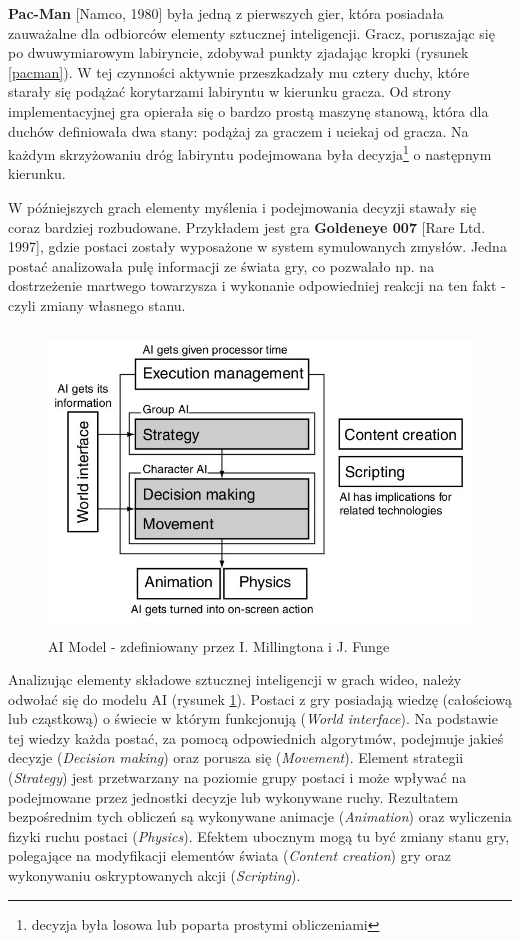 \textbf{Pac-Man} [Namco, 1980] była jedną z pierwszych gier, która posiadała zauważalne dla odbiorców elementy sztucznej inteligencji. Gracz, poruszając się po dwuwymiarowym labiryncie, zdobywał punkty zjadając kropki (rysunek \ref{pacman}). W tej czynności aktywnie przeszkadzały mu cztery duchy, które starały się podążać korytarzami labiryntu w kierunku gracza. Od strony implementacyjnej gra opierała się o bardzo prostą maszynę stanową, która dla duchów definiowała dwa stany: podążaj za graczem i uciekaj od gracza. Na każdym skrzyżowaniu dróg labiryntu podejmowana była decyzja\footnote{decyzja była losowa lub poparta prostymi obliczeniami} o następnym kierunku.

W późniejszych grach elementy myślenia i podejmowania decyzji stawały się coraz bardziej rozbudowane. Przykładem jest gra \textbf{Goldeneye 007} [Rare Ltd. 1997], gdzie postaci zostały wyposażone w system symulowanych zmysłów. Jedna postać analizowała pulę informacji ze świata gry, co pozwalało np. na dostrzeżenie martwego towarzysza i wykonanie odpowiedniej reakcji na ten fakt - czyli zmiany własnego stanu.

\begin{figure}
\begin{center}
	\includegraphics[width=120mm,height=80mm]{images/aimodel}
	\caption{AI Model - zdefiniowany przez I. Millingtona i J. Funge\label{aimodel}}
\end{center}
\end{figure}

Analizując elementy składowe sztucznej inteligencji w grach wideo, należy odwołać się do modelu AI (rysunek \ref{aimodel}). Postaci z gry posiadają wiedzę (całościową lub cząstkową) o świecie w którym funkcjonują (\emph{World interface}). Na podstawie tej wiedzy każda postać, za pomocą odpowiednich algorytmów, podejmuje jakieś decyzje (\emph{Decision making}) oraz porusza się (\emph{Movement}). Element strategii (\emph{Strategy}) jest przetwarzany na poziomie grupy postaci i może wpływać na podejmowane przez jednostki decyzje lub wykonywane ruchy. Rezultatem bezpośrednim tych obliczeń są wykonywane animacje (\emph{Animation}) oraz wyliczenia fizyki ruchu postaci (\emph{Physics}). Efektem ubocznym mogą tu być zmiany stanu gry, polegające na modyfikacji elementów świata (\emph{Content creation}) gry oraz wykonywaniu oskryptowanych akcji (\emph{Scripting}).


